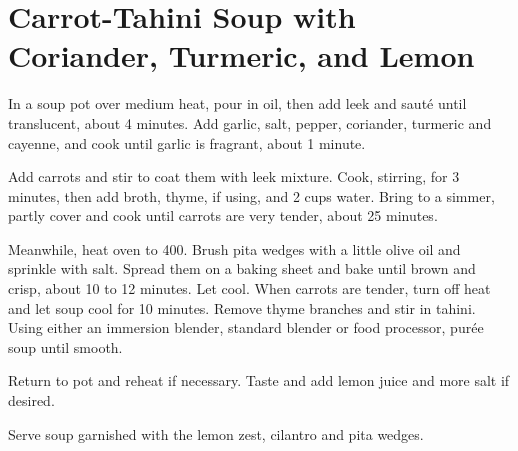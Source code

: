 \section{Carrot-Tahini Soup with Coriander, Turmeric, and Lemon}
\begin{recipe}




In a soup pot over medium heat, pour in oil, then add leek and sauté until translucent, about 4 minutes. Add garlic, salt, pepper, coriander, turmeric and cayenne, and cook until garlic is fragrant, about 1 minute.

Add carrots and stir to coat them with leek mixture. Cook, stirring, for 3 minutes, then add broth, thyme, if using, and 2 cups water. Bring to a simmer, partly cover and cook until carrots are very tender, about 25 minutes.

Meanwhile, heat oven to 400. Brush pita wedges with a little olive oil and sprinkle with salt. Spread them on a baking sheet and bake until brown and crisp, about 10 to 12 minutes. Let cool.
When carrots are tender, turn off heat and let soup cool for 10 minutes. Remove thyme branches and stir in tahini. Using either an immersion blender, standard blender or food processor, purée soup until smooth.

Return to pot and reheat if necessary. Taste and add lemon juice and more salt if desired.

Serve soup garnished with the lemon zest, cilantro and pita wedges.



\end{recipe}
